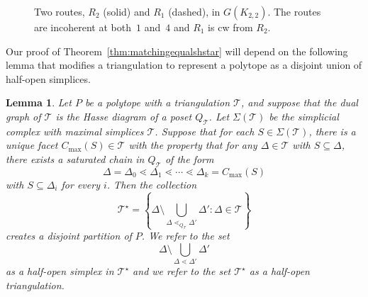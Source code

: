 \documentclass[12pt]{amsart}
\newcommand{\vertex}{\node[vertex]}
\newtheorem{lemma}[theorem]{Lemma}
\theoremstyle{definition}
\newcommand\calT{\mathcal{T}}
\begin{document}
\begin{figure}
\begin{center}
\end{center}
\caption{Two routes, $R_2$ (solid) and $R_1$ (dashed), in $G(K_{2,2})$.
The routes are incoherent at both~$1$ and~$4$  and $R_1$ is cw from $R_2$.}
\label{fig:incoherence}
\end{figure}


Our proof of Theorem~\ref{thm:matchingequalshstar} will depend on the following lemma that modifies a triangulation to represent a polytope as a disjoint union of half-open simplices.

\begin{lemma}\label{lem:disjointunion}
    Let $P$ be a polytope with a triangulation $\calT$, and suppose that the dual graph of $\calT$ is the Hasse diagram of a poset $Q_\calT$. 
    Let $\Sigma(\calT)$ be the simplicial complex with maximal simplices $\calT$.
    Suppose that for each $S\in\Sigma(\calT)$, there is a unique facet $C_{\max}(S)\in\calT$ with the property that for any $\Delta\in\calT$ with $S\subseteq\Delta$, there exists a saturated chain in $Q_\calT$ of the form 
    \[
        \Delta = \Delta_0 \lessdot \Delta_1 \lessdot \cdots \lessdot \Delta_k = C_{\max}(S) 
    \]
    with $S\subseteq\Delta_i$ for every $i$.
    Then the collection
    \[
        \calT^{\star} = \left\{\Delta \setminus \bigcup_{\Delta \lessdot_{Q_\calT} \Delta'} \Delta' : \Delta \in \calT\right\} 
    \]
    creates a disjoint partition of $P$.
    We refer to the set 
    \[
    \Delta \setminus \bigcup_{\Delta \lessdot \Delta'} \Delta'
    \]
    as a \emph{half-open simplex} in $\calT^\star$ and we refer to the set $\calT^\star$ as a \emph{half-open triangulation}.
\end{lemma}
\end{document}
